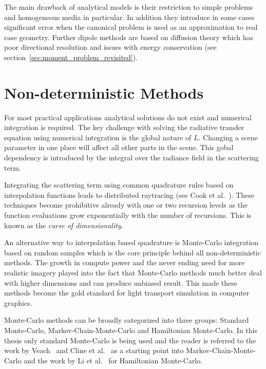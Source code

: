 The main drawback of analytical models is their restriction to simple problems and homogeneous media in particular. In addition they introduce in some cases significant error when the canonical problem is used as an approximation to real case geometry. Further dipole methods are based on diffusion theory which has poor directional resolution and issues with energy conservation (see section~\ref{sec:moment_problem_revisited}).

\section{Non-deterministic Methods}
\label{sec:foundations_mc}

For most practical applications analytical solutions do not exist and numerical integration is required. The key challenge with solving the radiative transfer equation using numerical integration is the global nature of $L$. Changing a scene parameter in one place will affect all other parts in the scene. This gobal dependency is introduced by the integral over the radiance field in the scattering term. 

Integrating the scattering term using common quadrature rules based on interpolation functions leads to distributed raytracing (see Cook et al.~\cite{Cook84}). These techniques become prohibitive already with one or two recursion levels as the function evaluations grow exponentially with the number of recursions. This is known as the \emph{curse of dimensionality}.

An alternative way to interpolation based quadrature is Monte-Carlo integration based on random samples which is the core principle behind all non-deterministic methods. The growth in compute power and the never ending need for more realistic imagery played into the fact that Monte-Carlo methods much better deal with higher dimensions and can produce unbiased result. This made these methods become the gold standard for light transport simulation in computer graphics. 

Monte-Carlo methods can be broadly categorized into three groups: Standard Monte-Carlo, Markov-Chain-Monte-Carlo and Hamiltonian Monte-Carlo. In this thesis only standard Monte-Carlo is being used and the reader is referred to the work by Veach~\cite{VeachThesis97} and Cline et al.~\cite{Cline05, Cline05apractical} as a starting point into Markov-Chain-Monte-Carlo and the work by Li et al.~\cite{Li15} for Hamiltonian Monte-Carlo.

